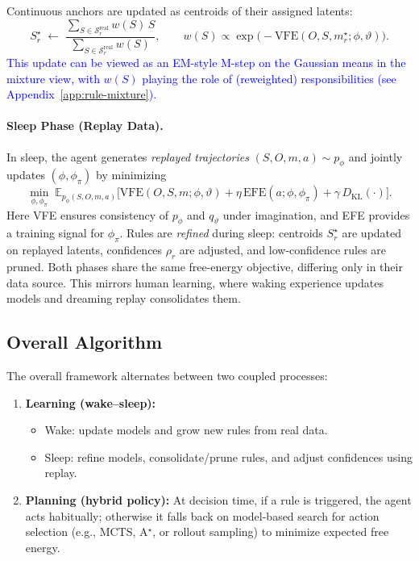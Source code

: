 \documentclass{article} %
\newcommand{\revise}[1]{\textcolor{blue}{#1}}
\begin{document}
Continuous anchors are updated as centroids of their assigned latents:
{\small\[
S_r^\star \;\leftarrow\; 
\frac{\sum_{S \in \mathcal S_r^{\mathrm{real}}} w(S)\,S}
     {\sum_{S \in \mathcal S_r^{\mathrm{real}}} w(S)},
\qquad
w(S) \propto \exp\!\big(-\text{VFE}(O,S,m_r^\star;\phi,\vartheta)\big).
\]}
\revise{This update can be viewed as an EM-style M-step on the Gaussian means in the mixture view, with $w(S)$ playing the role of (reweighted) responsibilities (see Appendix~\ref{app:rule-mixture}).}
\paragraph{Sleep Phase (Replay Data).}
In sleep, the agent generates \emph{replayed trajectories} $(S,O,m,a)\sim p_\phi$ and jointly updates 
$(\phi,\phi_\pi)$ by minimizing
{\small \[
\min_{\phi,\phi_\pi}\; 
\mathbb{E}_{p_\phi(S,O,m,a)}\Big[ 
\text{VFE}(O,S,m;\phi,\vartheta) + \eta\,\text{EFE}(a;\phi,\phi_\pi) 
+ \gamma\, D_{\mathrm{KL}}(\cdot) \Big].
\]}
Here VFE ensures consistency of $p_\phi$ and $q_\vartheta$ under imagination, and EFE provides a training 
signal for $\phi_\pi$.  
Rules are \emph{refined} during sleep: centroids $S_r^\star$ are updated on replayed latents, confidences 
$\rho_r$ are adjusted, and low-confidence rules are pruned. Both phases share the same free-energy objective, differing only in their data source.  
This mirrors human learning, where waking experience updates models and dreaming replay consolidates them.  
\subsection{Overall Algorithm}
The overall framework alternates between two coupled processes:  
\begin{enumerate}
  \item \textbf{Learning (wake--sleep):}  
  \begin{itemize}
    \item Wake: update models and grow new rules from real data.  
    \item Sleep: refine models, consolidate/prune rules, and adjust confidences using replay.  
  \end{itemize}
  \item \textbf{Planning (hybrid policy):}  
  At decision time, if a rule is triggered, the agent acts habitually; otherwise it falls back on 
  model-based search for action selection (e.g., MCTS, A$^\star$, or rollout sampling) to minimize expected free energy.  
\end{enumerate}
\end{document}

